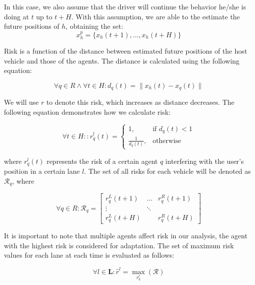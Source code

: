 \documentclass[letterpaper, 10 pt, conference]{ieeeconf}  %
\begin{document}
In this case, we also assume that the driver will continue the behavior he/she is doing at $t$ up to $t+H$. With this assumption, we are able to the estimate the future positions of $h$, obtaining the set:
\begin{equation}
    x_h^p = \{x_h(t+1),\ldots,x_h(t+H)\}
\end{equation}

Risk is a function of the distance between estimated future positions of the host vehicle and those of the agents. The distance is calculated using the following equation:

\begin{equation}
    \forall q \in R \land \forall t\in H : d_q(t) = \lVert x_h(t)-x_q(t)\rVert
\end{equation}

We will use $r$ to denote this risk, which increases as distance decreases. The following equation demonstrates how we calculate risk:

\begin{equation}
\forall{t}\in H::
    r_{q}^{l}(t) =
    \begin{cases}
    1,                      & \text{if } d_{q}(t) < 1 \\
    \frac{1}{d_{q}(t)},  & \text{otherwise} 
    \end{cases}
\end{equation}

where $r_{q}^{l}(t)$ represents the risk of a certain agent $q$ interfering with the user's position in a certain lane $l$. The set of all risks for each vehicle will be denoted as $\mathcal{R}_q$, where

\begin{equation}
    \forall{q} \in R: \mathcal{R}_q =
                    \begin{bmatrix}
                        r_q^L(t+1) & \dots & r_q^R(t+1) \\
                        \vdots & \ddots & \\
                        r_q^L(t+H) &    & r_q^R(t+H)
                    \end{bmatrix}
\end{equation}

It is important to note that multiple agents affect risk in our analysis, the agent with the highest risk is considered for adaptation. The set of maximum risk values for each lane at each time is evaluated as follows:

\begin{equation}
    \forall{l}\in\mathbf{L}:\hat{r}^l =  \max_{r_{q}^{l}}(\mathcal{R})
\end{equation}
\end{document}
